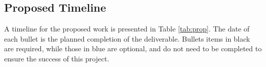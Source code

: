 
\subsection{Proposed Timeline}

%
%
A timeline for the proposed work is presented in Table
\ref{tab:prop}. The date of each bullet is the planned completion of the
deliverable. Bullets items in black are required, while those in blue
are optional, and do not need to be completed to ensure the
success of this project. 

% 
% 


